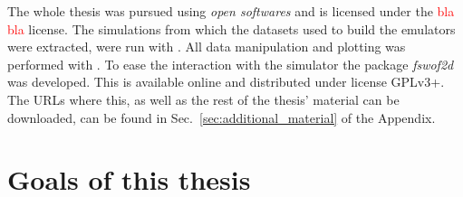 The whole thesis was pursued using \emph{open softwares} and is licensed under the \textcolor{red}{bla bla}  license.
The simulations from which the datasets used to build the emulators were extracted, were run with .
All data manipulation and plotting was performed with .
To ease the interaction with the simulator the  package \emph{fswof2d} was developed.
This is available online and distributed under license GPLv3+.
The URLs where this, as well as the rest of the thesis' material can be downloaded, can be found in Sec.~\ref{sec:additional_material} of the Appendix.


\section{Goals of this thesis}



















